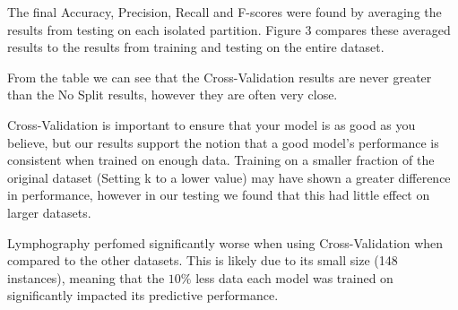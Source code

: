 \documentclass[11pt]{article}
\begin{document}
    The final Accuracy, Precision, Recall and F-scores were found by averaging the results from testing on each isolated partition. Figure 3 compares these averaged results to the results from training and testing on the entire dataset.

    From the table we can see that the Cross-Validation results are never greater than the No Split results, however they are often very close.

    Cross-Validation is important to ensure that your model is as good as you believe, but our results support the notion that a good model's performance is consistent when trained on enough data. Training on a smaller fraction of the original dataset (Setting k to a lower value) may have shown a greater difference in performance, however in our testing we found that this had little effect on larger datasets.

    Lymphography perfomed significantly worse when using Cross-Validation when compared to the other datasets. This is likely due to its small size (148 instances), meaning that the $10\%$ less data each model was trained on significantly impacted its predictive performance.
\end{document}
